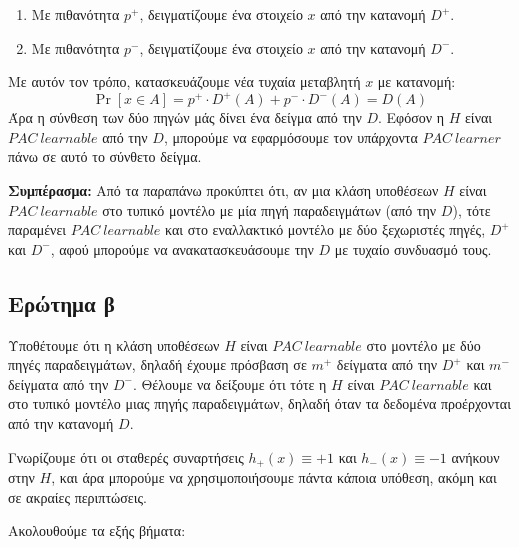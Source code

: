 \documentclass[12pt]{article}
\begin{document}
\begin{enumerate}
  \item Με πιθανότητα $p^+$, δειγματίζουμε ένα στοιχείο $x$ από την κατανομή $D^+$.
  \item Με πιθανότητα $p^-$, δειγματίζουμε ένα στοιχείο $x$ από την κατανομή $D^-$.
\end{enumerate}

Με αυτόν τον τρόπο, κατασκευάζουμε νέα τυχαία μεταβλητή $x$ με κατανομή:
\[
\Pr[x \in A] = p^+ \cdot D^+(A) + p^- \cdot D^-(A) = D(A)
\]
Άρα η σύνθεση των δύο πηγών μάς δίνει ένα δείγμα από την $D$. Εφόσον η $H$ είναι $PAC\ learnable$ από την $D$, μπορούμε να εφαρμόσουμε τον υπάρχοντα $PAC\ learner$ πάνω σε αυτό το σύνθετο δείγμα.

\textbf{Συμπέρασμα:} Από τα παραπάνω προκύπτει ότι, αν μια κλάση υποθέσεων $H$ είναι $PAC\ learnable$ στο τυπικό μοντέλο με μία πηγή παραδειγμάτων (από την $D$), τότε παραμένει $PAC\ learnable$ και στο εναλλακτικό μοντέλο με δύο ξεχωριστές πηγές, $D^+$ και $D^-$, αφού μπορούμε να ανακατασκευάσουμε την $D$ με τυχαίο συνδυασμό τους.

\vspace{1em}
\subsection*{Ερώτημα β}

Υποθέτουμε ότι η κλάση υποθέσεων $H$ είναι $PAC\ learnable$ στο μοντέλο με δύο πηγές παραδειγμάτων, δηλαδή έχουμε πρόσβαση σε $m^+$ δείγματα από την $D^+$ και $m^-$ δείγματα από την $D^-$. Θέλουμε να δείξουμε ότι τότε η $H$ είναι $PAC\ learnable$ και στο τυπικό μοντέλο μιας πηγής παραδειγμάτων, δηλαδή όταν τα δεδομένα προέρχονται από την κατανομή $D$.

Γνωρίζουμε ότι οι σταθερές συναρτήσεις $h_+(x) \equiv +1$ και $h_-(x) \equiv -1$ ανήκουν στην $H$, και άρα μπορούμε να χρησιμοποιήσουμε πάντα κάποια υπόθεση, ακόμη και σε ακραίες περιπτώσεις.

Ακολουθούμε τα εξής βήματα:
\end{document}
